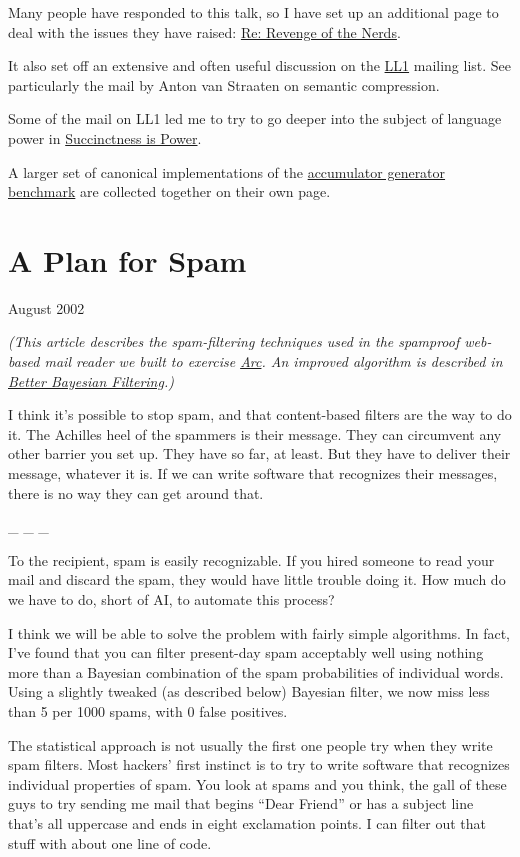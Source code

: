\documentclass[12pt]{book}
\begin{document}
Many people have responded to this talk, so I have set up an additional
page to deal with the issues they have raised: \href{icadmore.html}{Re:
Revenge of the Nerds}.

It also set off an extensive and often useful discussion on the
\href{http://www.ai.mit.edu/~gregs/ll1-discuss-archive-html/threads.html}{LL1}
mailing list. See particularly the mail by Anton van Straaten on
semantic compression.

Some of the mail on LL1 led me to try to go deeper into the subject of
language power in \href{power.html}{Succinctness is Power}.

A larger set of canonical implementations of the
\href{accgen.html}{accumulator generator benchmark} are collected
together on their own page.
\chapter{A Plan for Spam}

August 2002

\emph{(This article describes the spam-filtering techniques used in the
spamproof web-based mail reader we built to exercise
\href{arc.html}{Arc}. An improved algorithm is described in
\href{better.html}{Better Bayesian Filtering}.)}

I think it's possible to stop spam, and that content-based filters are
the way to do it. The Achilles heel of the spammers is their message.
They can circumvent any other barrier you set up. They have so far, at
least. But they have to deliver their message, whatever it is. If we can
write software that recognizes their messages, there is no way they can
get around that.

\_ \_ \_

To the recipient, spam is easily recognizable. If you hired someone to
read your mail and discard the spam, they would have little trouble
doing it. How much do we have to do, short of AI, to automate this
process?

I think we will be able to solve the problem with fairly simple
algorithms. In fact, I've found that you can filter present-day spam
acceptably well using nothing more than a Bayesian combination of the
spam probabilities of individual words. Using a slightly tweaked (as
described below) Bayesian filter, we now miss less than 5 per 1000
spams, with 0 false positives.

The statistical approach is not usually the first one people try when
they write spam filters. Most hackers' first instinct is to try to write
software that recognizes individual properties of spam. You look at
spams and you think, the gall of these guys to try sending me mail that
begins ``Dear Friend'' or has a subject line that's all uppercase and
ends in eight exclamation points. I can filter out that stuff with about
one line of code.
\end{document}
